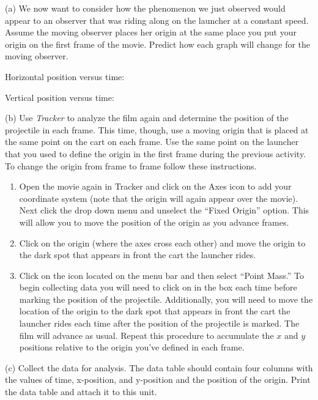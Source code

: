 (a) We now want to consider how the phenomenon we just observed would
appear to an observer that was riding along on the launcher at a constant
speed. Assume the moving observer places her origin at the same place
you put your origin on the first frame of the movie. Predict how each
graph will change for the moving observer.

Horizontal position versus time:
\vspace{10mm}

Vertical position versus time:
\vspace{10mm}

(b) Use \emph{Tracker} to analyze the film  again and determine the position of the projectile in each
frame. This time, though, use a moving origin that is placed
at the same point on the cart on each frame. Use the same point on
the launcher that you used to define the origin in the first frame
during the previous activity. To change the origin from frame to frame
follow these instructions.

\begin{enumerate}
\item Open the movie again in Tracker and click on the Axes icon to add your coordinate system (note that the origin will again appear over the movie).  Next click the  drop down menu and unselect the ``Fixed Origin'' option. This will allow you to move the position of the origin as you advance frames.

\item Click on the origin (where the axes cross each other) and move the origin to the dark spot that appears in front the cart the launcher rides.

\item Click on the  icon located on the menu bar and then select ``Point Mass.''  To begin collecting data you will need to click on  in the  box each time before marking the position of the projectile.  Additionally, you will need to move the location of the origin to the dark spot that appears in front the cart the launcher rides each time after the position of the projectile is marked.  The film will advance as usual. Repeat this procedure to accumulate
the $x$ and $y$ positions relative to the origin you've defined in each
frame.
\end{enumerate}
(c) Collect the data for analysis. The data table should contain four
columns with the values of time, x-position, and y-position and the
position of the origin. Print the data table and attach it to this unit.

